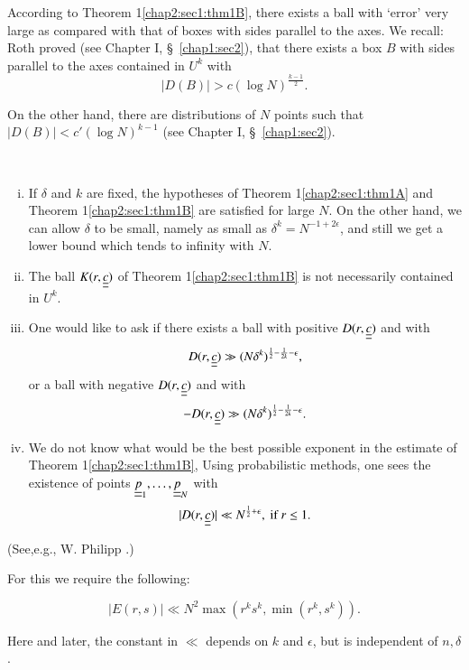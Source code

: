 According to Theorem 1\ref{chap2:sec1:thm1B}, there exists a ball with `error' very large as compared with that of boxes with sides parallel to the axes. We recall: Roth proved (see Chapter I, \S\ \ref{chap1:sec2}), that there exists a box $B$ with sides parallel to the axes contained in $U^{k}$ with
$$
|D(B)| > c (\log N)^{\frac{k-1}{2}}.
$$ 

On the other hand, there are distributions of $N$ points such that $|D(B)| < c' (\log N)^{k-1}$ (see Chapter I, \S\ \ref{chap1:sec2}).

\medskip
\begin{remarks*}
~
 \begin{enumerate}[(i)]
  \item If $\delta$ and $k$ are fixed, the hypotheses of Theorem 1\ref{chap2:sec1:thm1A} and Theorem 1\ref{chap2:sec1:thm1B} are satisfied for large $N$. On the other hand, we can allow $\delta$ to be small, namely as small as $\delta^{k} = N^{-1+2\epsilon}$, and still we get a lower bound which tends to infinity with $N$.
  \item The ball $K(r, \underline{\underline{c}})$ of Theorem 1\ref{chap2:sec1:thm1B} is not necessarily contained in $U^{k}$.
 \item One would like to ask if there exists a ball with positive $D(r, \underline{\underline{c}})$ and with
$$
D(r, \underline{\underline{c}}) \gg (N \delta^{k})^{\frac{1}{2} - \frac{1}{2k} - \epsilon},
$$
or a ball with negative $D(r, \underline{\underline{c}})$ and with
$$
-D(r, \underline{\underline{c}}) \gg (N \delta^{k})^{\frac{1}{2} - \frac{1}{2k} - \epsilon}.
$$
 \item We do not know what would be the best possible exponent in the estimate of Theorem 1\ref{chap2:sec1:thm1B}, Using probabilistic methods, one sees the existence of points $\underline{\underline{p}}_{1}, \ldots, \underline{\underline{p}}_{N}$ with
$$
|D(r, \underline{\underline{c}})| \ll N^{\frac{1}{2} + \epsilon}, \text{ if } r \leq 1.
$$
 \end{enumerate}
\end{remarks*}

(See,\pageoriginale e.g., W. Philipp \cite{18}.)

\medskip
{} For this we require the following:
\begin{lemma}\label{chap2:sec1:lem1C}
$$
|E(r, s)| \ll N^{2} \max (r^{k} s^{k}, \min (r^{k}, s^{k})).
$$
\end{lemma}

\begin{remark*}
Here and later, the constant in $\ll$ depends on $k$ and $\epsilon$, but is independent of $n, \delta$.
\end{remark*}

